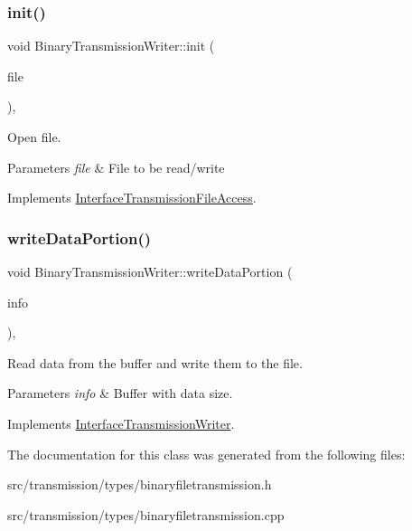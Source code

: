 \subsubsection{\texorpdfstring{init()}{init()}}
{\footnotesize\ttfamily void Binary\+Transmission\+Writer\+::init (\begin{DoxyParamCaption}\item[{const Q\+File \&}]{file }\end{DoxyParamCaption})\hspace{0.3cm}{\ttfamily [override]}, {\ttfamily [virtual]}}



Open file. 


\begin{DoxyParams}{Parameters}
{\em file} & File to be read/write \\
\hline
\end{DoxyParams}


Implements \hyperlink{classInterfaceTransmissionFileAccess_a8c423ccb527b1dda62c798a75b6eb690}{Interface\+Transmission\+File\+Access}.

\mbox{\label{classBinaryTransmissionWriter_aaeee88a165c1a53ef89849c08df6a5e1}} 
\subsubsection{\texorpdfstring{write\+Data\+Portion()}{writeDataPortion()}}
{\footnotesize\ttfamily void Binary\+Transmission\+Writer\+::write\+Data\+Portion (\begin{DoxyParamCaption}\item[{Buffer\+Info}]{info }\end{DoxyParamCaption})\hspace{0.3cm}{\ttfamily [override]}, {\ttfamily [virtual]}}



Read data from the buffer and write them to the file. 


\begin{DoxyParams}{Parameters}
{\em info} & Buffer with data size. \\
\hline
\end{DoxyParams}


Implements \hyperlink{classInterfaceTransmissionWriter_a024c3a22d937e659259f2eb242b3ea97}{Interface\+Transmission\+Writer}.



The documentation for this class was generated from the following files\+:\begin{DoxyCompactItemize}
\item 
src/transmission/types/binaryfiletransmission.\+h\item 
src/transmission/types/binaryfiletransmission.\+cpp\end{DoxyCompactItemize}
